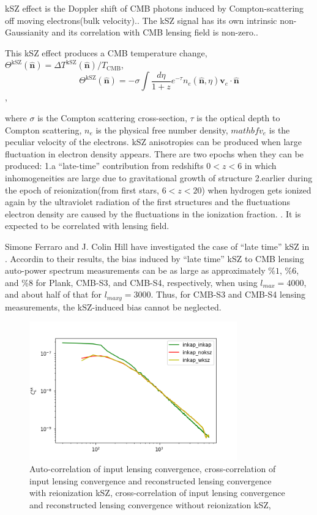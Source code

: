 \documentclass[12pt, notitlepage, onecolumn, amsmath, amssymb, aps]{revtex4-1}
\begin{document}
kSZ effect is the Doppler shift of CMB photons induced by Compton-scattering off moving electrons(bulk velocity).\cite{Ferraro:2017fac}. The kSZ signal has its own intrinsic non-Gaussianity and its correlation with CMB lensing field is non-zero.\cite{Smith:2016lnt}.

This kSZ effect produces a CMB temperature change, \(\Theta^{\mathrm{kSZ}}(\hat{\mathbf{n}})=\Delta T^{\mathrm{kSZ}}(\hat{\mathbf{n}}) / T_{\mathrm{CMB}}\),
\begin{equation}
  \Theta^{\mathrm{kSZ}}(\hat{\mathbf{n}})=-\sigma \int \frac{d \eta}{1+z} e^{-\tau} n_{e}(\hat{\mathbf{n}}, \eta) \mathbf{v}_{e} \cdot \hat{\mathbf{n}}
\end{equation} \cite{Ferraro:2017fac},

where \(\sigma\) is the Compton scattering cross-section, \(\tau\) is the optical depth to Compton scattering, \(n_{e}\) is the physical free number density, \(mathbf{v}_{e}\) is the peculiar velocity of the electrons.
kSZ anisotropies can be produced when large fluctuation in electron density appears. There are two epochs when they can be produced: 1.a ``late-time'' contribution from redshifts \(0<z<6\) in which inhomogeneities are large due to gravitational growth of structure 2.earlier during the epoch of reionization(from first stars, \(6<z<20\)) when hydrogen gets ionized again by the ultraviolet radiation of the first structures and the fluctuations electron density are caused by the fluctuations in the ionization fraction.\cite{Ferraro:2017fac} \cite{Alvarez:2015xzu}. It is expected to be correlated with lensing field.

Simone Ferraro and J. Colin Hill  have investigated the case of ``late time'' kSZ in \cite{Ferraro:2017fac}. Accordin to their results, the bias induced by ``late time'' kSZ to CMB lensing auto-power spectrum measurements can be as large as approximately \(\%1\), \(\%6\), and \(\%8\) for Plank, CMB-S3, and CMB-S4, respectively, when using \(l_{max} = 4000\), and about half of that for \(l_{maxy} = 3000\). Thus, for CMB-S3 and CMB-S4 lensing measurements, the kSZ-induced bias cannot be neglected.

\begin{figure}[h]
\includegraphics[width=0.8\textwidth]{cross_correlation3.png}
\caption{Auto-correlation of input lensing convergence, cross-correlation of input lensing convergence and reconstructed lensing convergence with reionization kSZ, cross-correlation of input lensing convergence and reconstructed lensing convergence without reionization kSZ, }
\end{figure}
\end{document}
